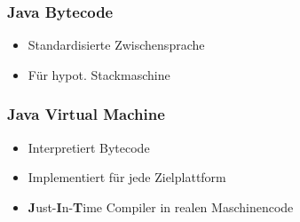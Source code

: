 \begin{minipage}[t]{0.36\columnwidth}
    \subsubsection{Java Bytecode}
    \raggedright%
    \begin{itemize}
        \item Standardisierte Zwischensprache
        \item Für hypot. Stackmaschine
    \end{itemize}
\end{minipage}\hfill%
\begin{minipage}[t]{0.63\columnwidth}
    \subsubsection{Java Virtual Machine}
    \raggedright%
    \begin{itemize}
        \item Interpretiert Bytecode
        \item Implementiert für jede Zielplattform
        \item \textbf{J}ust-\textbf{I}n-\textbf{T}ime Compiler in realen Maschinencode
    \end{itemize}
\end{minipage}